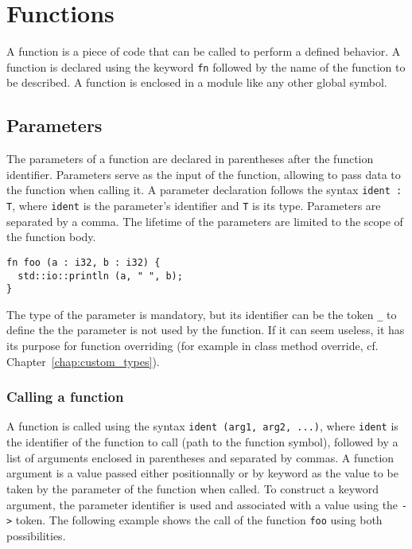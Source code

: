 \section{Functions}%
\label{sec:functions}

A function is a piece of code that can be called to perform a defined behavior.
A function is declared using the keyword \texttt{fn} followed by the name of the
function to be described. A function is enclosed in a module like any other
global symbol.

\subsection{Parameters}

The parameters of a function are declared in parentheses after the function
identifier. Parameters serve as the input of the function, allowing to pass data
to the function when calling it. A parameter declaration follows the syntax
\texttt{ident : T}, where \texttt{ident} is the parameter's identifier and
\texttt{T} is its type. Parameters are separated by a comma. The lifetime of the
parameters are limited to the scope of the function body.

\begin{lstlisting}[style=coloredverbatim]
fn foo (a : i32, b : i32) {
  std::io::println (a, " ", b);
}
\end{lstlisting}

The type of the parameter is mandatory, but its identifier can be the token
\texttt{\_} to define the the parameter is not used by the function. If it can
seem useless, it has its purpose for function overriding (for example in class
method override, cf. Chapter~\ref{chap:custom_types}).

\subsubsection {Calling a function}

A function is called using the syntax \texttt{ident (arg1, arg2, ...)}, where
\texttt{ident} is the identifier of the function to call (path to the function
symbol), followed by a list of arguments enclosed in parentheses and separated
by commas. A function argument is a value passed either positionnally or by
keyword as the value to be taken by the parameter of the function when called.
To construct a keyword argument, the parameter identifier is used and associated
with a value using the \texttt{->} token. The following example shows the call
of the function \texttt{foo} using both possibilities.

